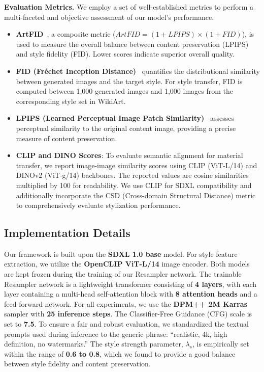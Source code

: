 \noindent\textbf{Evaluation Metrics.}
We employ a set of well-established metrics to perform a multi-faceted and objective assessment of our model's performance.
\begin{itemize}
    \item \textbf{ArtFID}~\cite{wright2022artfid}, a composite metric ($ArtFID = (1 + LPIPS) \times (1 + FID)$), is used to measure the overall balance between content preservation (LPIPS) and style fidelity (FID). Lower scores indicate superior overall quality.
    \item \textbf{FID (Fr\'echet Inception Distance)}~\cite{heusel2017gans} quantifies the distributional similarity between generated images and the target style. For style transfer, FID is computed between 1,000 generated images and 1,000 images from the corresponding style set in WikiArt.
    \item \textbf{LPIPS (Learned Perceptual Image Patch Similarity)}~\cite{zhang2018perceptual} assesses perceptual similarity to the original content image, providing a precise measure of content preservation.
    \item \textbf{CLIP and DINO Scores}: To evaluate semantic alignment for material transfer, we report image-image similarity scores using CLIP (ViT-L/14) and DINOv2 (ViT-g/14) backbones. The reported values are cosine similarities multiplied by 100 for readability. We use CLIP for SDXL compatibility and additionally incorporate the CSD (Cross-domain Structural Distance) metric to comprehensively evaluate stylization performance.
\end{itemize}


\subsection{Implementation Details}
Our framework is built upon the \textbf{SDXL 1.0 base} model. For style feature extraction, we utilize the \textbf{OpenCLIP ViT-L/14} image encoder. Both models are kept frozen during the training of our Resampler network. The trainable Resampler network is a lightweight transformer consisting of \textbf{4 layers}, with each layer containing a multi-head self-attention block with \textbf{8 attention heads} and a feed-forward network. 
For all experiments, we use the \textbf{DPM++ 2M Karras} sampler with \textbf{25 inference steps}. The Classifier-Free Guidance (CFG) scale is set to \textbf{7.5}. To ensure a fair and robust evaluation, we standardized the textual prompts used during inference to the generic phrase: ``realistic, 4k, high definition, no watermarks.'' The style strength parameter, $\lambda_s$, is empirically set within the range of \textbf{0.6 to 0.8}, which we found to provide a good balance between style fidelity and content preservation.

